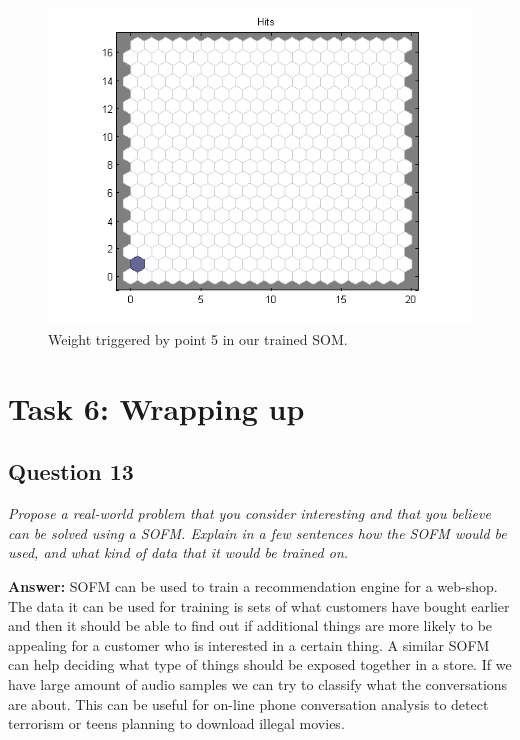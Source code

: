 \documentclass[a4paper]{article}
\begin{document}
 \begin{figure}[H] %
	 \includegraphics[scale=0.5]{point5.png}
	 \caption{\label{fig:point5} Weight triggered by point 5 in our trained SOM.}
 \end{figure}
 \pagebreak
\section*{Task 6: Wrapping up}

\subsection*{Question 13}
\emph{Propose a real-world problem that you consider interesting and
that you believe can be solved using a SOFM. Explain in a few sentences how the
SOFM would be used, and what kind of data that it would be trained on.}

\textbf{Answer:} SOFM can be used to train a recommendation engine for a web-shop. The data it can be used for training is sets of what customers have bought earlier and then it should be able to find out if additional things are more likely to be appealing for a customer who is interested in a certain thing. 
A similar SOFM can help deciding what type of things should be exposed together in a store. 
If we have large amount of audio samples we can try to classify what the conversations are about. This can be useful for on-line phone conversation analysis to detect terrorism or teens planning to download illegal movies. 
\end{document}
